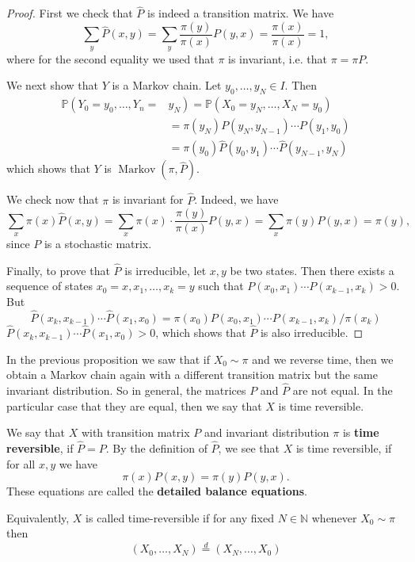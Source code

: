 \documentclass[a4paper]{article}
\begin{document}
\begin{proof}
    First we check that $\widehat{P}$ is indeed a transition matrix. We have
    \[
    \sum_y \widehat{P}(x, y)=\sum_y \frac{\pi(y)}{\pi(x)} P(y, x)=\frac{\pi(x)}{\pi(x)}=1,
    \]
    where for the second equality we used that $\pi$ is invariant, i.e. that $\pi=\pi P$.

    We next show that $Y$ is a Markov chain. Let $y_0, \ldots, y_N \in I$. Then
    \[
    \begin{aligned}
    \mathbb{P}\left(Y_0=y_0, \ldots, Y_n=\right.&\left.y_N\right)=\mathbb{P}\left(X_0=y_N, \ldots, X_N=y_0\right) \\
    &=\pi\left(y_N\right) P\left(y_N, y_{N-1}\right) \cdots P\left(y_1, y_0\right) \\
    &=\pi\left(y_0\right) \widehat{P}\left(y_0, y_1\right) \cdots \widehat{P}\left(y_{N-1},     y_N\right)
    \end{aligned}
    \]
    which shows that $Y$ is $\operatorname{Markov}(\pi, \widehat{P})$.

    We check now that $\pi$ is invariant for $\widehat{P}$. Indeed, we have
    \[
    \sum_x \pi(x) \widehat{P}(x, y)=\sum_x \pi(x) \cdot \frac{\pi(y)}{\pi(x)} P(y, x)=\sum_x \pi(y) P(y, x)=\pi(y),
    \]
    since $P$ is a stochastic matrix.

    Finally, to prove that $\widehat{P}$ is irreducible, let $x, y$ be two states. Then there exists a sequence of states $x_0=x, x_1, \ldots, x_k=y$ such that $P\left(x_0, x_1\right) \cdots P\left(x_{k-1}, x_k\right)>0$. But
    \[
    \widehat{P}\left(x_k, x_{k-1}\right) \cdots \widehat{P}\left(x_1, x_0\right)=\pi\left(x_0\right) P\left(x_0, x_1\right) \cdots P\left(x_{k-1}, x_k\right) / \pi\left(x_k\right)
    \]
    $\widehat{P}\left(x_k, x_{k-1}\right) \cdots \widehat{P}\left(x_1, x_0\right)>0$, which shows that $\widehat{P}$ is also irreducible.   
\end{proof}

In the previous proposition we saw that if $X_0 \sim \pi$ and we reverse time, then we obtain a Markov chain again with a different transition matrix but the same invariant distribution. So in general, the matrices $P$ and $\widehat{P}$ are not equal. In the particular case that they are equal, then we say that $X$ is time reversible.

\begin{definition}
    We say that $X$ with transition matrix $P$ and invariant distribution $\pi$ is \textbf{time reversible}, if $\widehat{P}=P$. By the definition of $\widehat{P}$, we see that $X$ is time reversible, if for all $x, y$ we have
    \[
    \pi(x) P(x, y)=\pi(y) P(y, x) .
    \]
    These equations are called the \textbf{detailed balance equations}.

    Equivalently, $X$ is called time-reversible if for any fixed $N \in \mathbb{N}$ whenever $X_0 \sim \pi$ then
    \[
    \left(X_0, \ldots, X_N\right) \stackrel{d}{=}\left(X_N, \ldots, X_0\right)
    \]
\end{definition}
\end{document}
